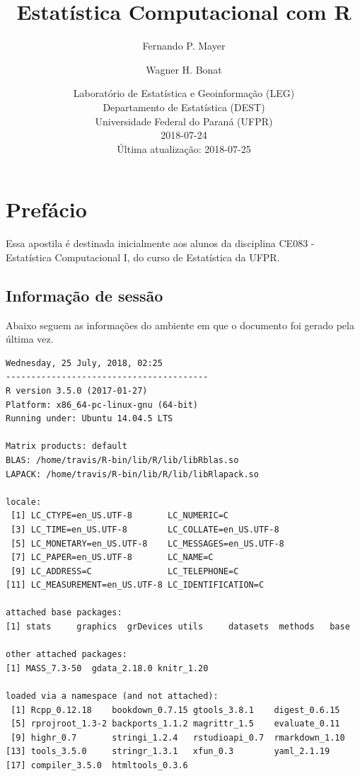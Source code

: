 \documentclass[10pt,a4paper]{book}
\title{Estatística Computacional com R}
\author{Fernando P. Mayer \and Wagner H. Bonat}
\date{Laboratório de Estatística e Geoinformação (LEG)\\
Departamento de Estatística (DEST)\\
Universidade Federal do Paraná (UFPR)\\[2\baselineskip]2018-07-24\\
Última atualização: 2018-07-25}
\begin{document}
\maketitle

{
\hypersetup{linkcolor=black}
\setcounter{tocdepth}{2}
\tableofcontents
}
\chapter*{Prefácio}\label{prefacio}


Essa apostila é destinada inicialmente aos alunos da disciplina CE083 -
Estatística Computacional I, do curso de Estatística da UFPR.

\section*{Informação de sessão}\label{informacao-de-sessao}


Abaixo seguem as informações do ambiente em que o documento foi gerado
pela última vez.

\begin{verbatim}
Wednesday, 25 July, 2018, 02:25
----------------------------------------
R version 3.5.0 (2017-01-27)
Platform: x86_64-pc-linux-gnu (64-bit)
Running under: Ubuntu 14.04.5 LTS

Matrix products: default
BLAS: /home/travis/R-bin/lib/R/lib/libRblas.so
LAPACK: /home/travis/R-bin/lib/R/lib/libRlapack.so

locale:
 [1] LC_CTYPE=en_US.UTF-8       LC_NUMERIC=C              
 [3] LC_TIME=en_US.UTF-8        LC_COLLATE=en_US.UTF-8    
 [5] LC_MONETARY=en_US.UTF-8    LC_MESSAGES=en_US.UTF-8   
 [7] LC_PAPER=en_US.UTF-8       LC_NAME=C                 
 [9] LC_ADDRESS=C               LC_TELEPHONE=C            
[11] LC_MEASUREMENT=en_US.UTF-8 LC_IDENTIFICATION=C       

attached base packages:
[1] stats     graphics  grDevices utils     datasets  methods   base     

other attached packages:
[1] MASS_7.3-50  gdata_2.18.0 knitr_1.20  

loaded via a namespace (and not attached):
 [1] Rcpp_0.12.18    bookdown_0.7.15 gtools_3.8.1    digest_0.6.15  
 [5] rprojroot_1.3-2 backports_1.1.2 magrittr_1.5    evaluate_0.11  
 [9] highr_0.7       stringi_1.2.4   rstudioapi_0.7  rmarkdown_1.10 
[13] tools_3.5.0     stringr_1.3.1   xfun_0.3        yaml_2.1.19    
[17] compiler_3.5.0  htmltools_0.3.6
\end{verbatim}
\end{document}
